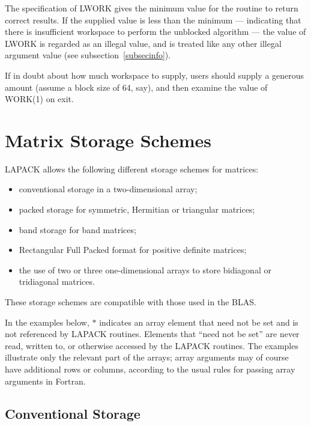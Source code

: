 The specification of LWORK gives the minimum value for the
routine to return correct results. If the supplied value is less than
the minimum --- indicating that there is insufficient workspace to perform
the unblocked algorithm --- the value of LWORK is regarded as an illegal value,
and is treated like any other illegal argument value
(see subsection~\ref{subsecinfo}).

If in doubt about how much workspace to supply, users should supply a generous
amount (assume a block size of 64, say), 
and then examine the value of WORK(1) on exit.

\section{Matrix Storage Schemes}\label{secstorage}

LAPACK allows the following different storage schemes 
for matrices:

\begin{itemize}

\item conventional storage in a two-dimensional array;

\item packed storage for symmetric, Hermitian or triangular matrices;

\item band storage for band matrices; 

\item Rectangular Full Packed format
 for positive definite matrices;

\item the use of two or three
one-dimensional arrays to store bidiagonal or tridiagonal
matrices.

\end{itemize}

These storage schemes are compatible with those
used in the BLAS.

In the examples below, $\ast$ indicates an array element that need not be set
and is not referenced by LAPACK routines. Elements that ``need not be
set'' are never read, written to, or otherwise accessed by the LAPACK
routines.  The examples illustrate only the
relevant part of the arrays; array arguments may of course have additional
rows or columns, according to the usual rules for passing array arguments
in Fortran.

\subsection{Conventional Storage}\label{subsecconventional}

